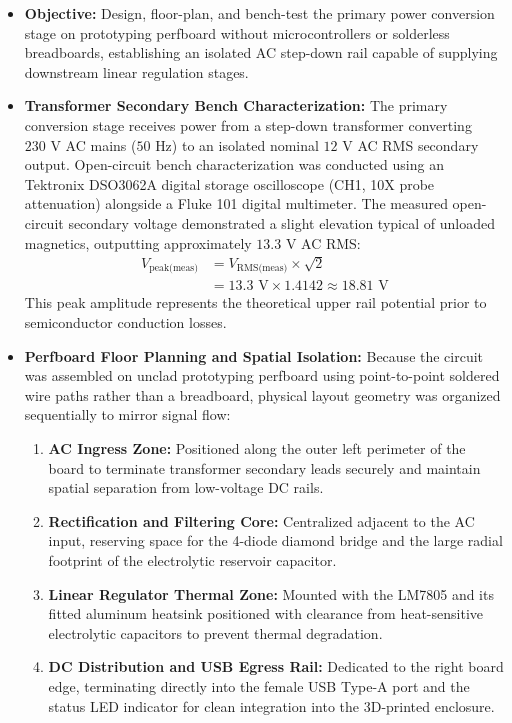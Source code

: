 \documentclass[journal,12pt,onecolumn]{IEEEtran}
\begin{document}
\begin{itemize}
    \item \textbf{Objective:} Design, floor-plan, and bench-test the primary power conversion stage on prototyping perfboard without microcontrollers or solderless breadboards, establishing an isolated AC step-down rail capable of supplying downstream linear regulation stages.
    
    \item \textbf{Transformer Secondary Bench Characterization:} The primary conversion stage receives power from a step-down transformer converting $230\text{ V}$ AC mains ($50\text{ Hz}$) to an isolated nominal $12\text{ V}$ AC RMS secondary output. Open-circuit bench characterization was conducted using an Tektronix DSO3062A digital storage oscilloscope (CH1, 10X probe attenuation) alongside a Fluke 101 digital multimeter. The measured open-circuit secondary voltage demonstrated a slight elevation typical of unloaded magnetics, outputting approximately $13.3\text{ V}$ AC RMS:
    \begin{align}
        V_{\text{peak(meas)}} &= V_{\text{RMS(meas)}} \times \sqrt{2} \nonumber \\
        &= 13.3\text{ V} \times 1.4142 \approx 18.81\text{ V}
    \end{align}
    This peak amplitude represents the theoretical upper rail potential prior to semiconductor conduction losses.

    \item \textbf{Perfboard Floor Planning and Spatial Isolation:} Because the circuit was assembled on unclad prototyping perfboard using point-to-point soldered wire paths rather than a breadboard, physical layout geometry was organized sequentially to mirror signal flow:
    \begin{enumerate}
        \item \textbf{AC Ingress Zone:} Positioned along the outer left perimeter of the board to terminate transformer secondary leads securely and maintain spatial separation from low-voltage DC rails.
        \item \textbf{Rectification and Filtering Core:} Centralized adjacent to the AC input, reserving space for the 4-diode diamond bridge and the large radial footprint of the electrolytic reservoir capacitor.
        \item \textbf{Linear Regulator Thermal Zone:} Mounted with the LM7805 and its fitted aluminum heatsink positioned with clearance from heat-sensitive electrolytic capacitors to prevent thermal degradation.
        \item \textbf{DC Distribution and USB Egress Rail:} Dedicated to the right board edge, terminating directly into the female USB Type-A port and the status LED indicator for clean integration into the 3D-printed enclosure.
    \end{enumerate}
\end{itemize}
\end{document}
